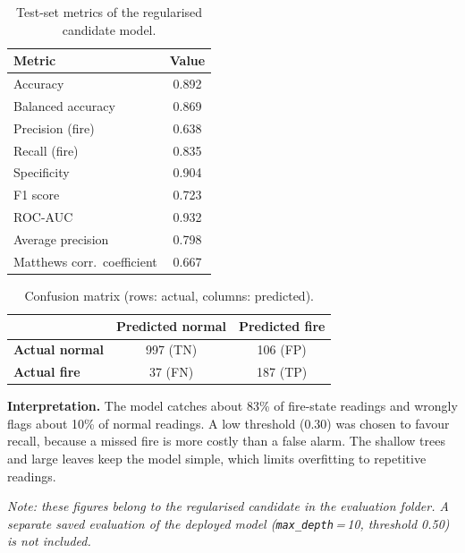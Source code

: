 \documentclass[12pt,a4paper]{article}
\begin{document}
\begin{table}[H]
\centering
\caption{Test-set metrics of the regularised candidate model.}
\label{tab:metrics}
\begin{tabular}{lc}
\toprule
\textbf{Metric} & \textbf{Value} \\
\midrule
Accuracy                    & 0.892 \\
Balanced accuracy           & 0.869 \\
Precision (fire)            & 0.638 \\
Recall (fire)               & 0.835 \\
Specificity                 & 0.904 \\
F1 score                    & 0.723 \\
ROC-AUC                     & 0.932 \\
Average precision           & 0.798 \\
Matthews corr.\ coefficient & 0.667 \\
\bottomrule
\end{tabular}
\end{table}

\begin{table}[H]
\centering
\caption{Confusion matrix (rows: actual, columns: predicted).}
\label{tab:cm}
\begin{tabular}{lcc}
\toprule
 & \textbf{Predicted normal} & \textbf{Predicted fire} \\
\midrule
\textbf{Actual normal} & 997 (TN) & 106 (FP) \\
\textbf{Actual fire}   & 37 (FN)  & 187 (TP) \\
\bottomrule
\end{tabular}
\end{table}

\textbf{Interpretation.} The model catches about 83\% of fire-state readings and wrongly flags about 10\% of normal readings. A low threshold (0.30) was chosen to favour recall, because a missed fire is more costly than a false alarm. The shallow trees and large leaves keep the model simple, which limits overfitting to repetitive readings.

\emph{Note: these figures belong to the regularised candidate in the evaluation folder. A separate saved evaluation of the deployed model (\texttt{max\_depth}\,=\,10, threshold 0.50) is not included.}

\end{document}
